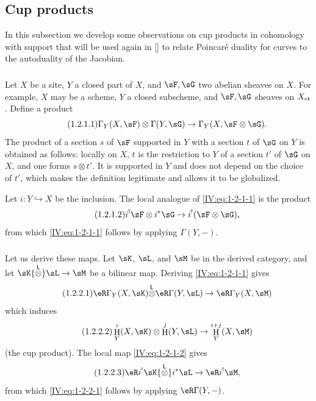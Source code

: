 \documentclass[12pt,oneside,english]{smfbook}
\DeclareMathOperator{\h}{H}
\newcommand{\et}[1]{{#1}_{\textnormal{et}}}
\newcommand{\lotimes}{{\overset{\mathsf{L}}{\otimes}}}
\begin{document}
\subsection{Cup products}\label{IV:1-2}

In this subsection we develop some observations on cup products in cohomology with support that will be used again in [] to relate Poincaré duality for curves to the autoduality of the Jacobian.

\subsubsection{}\label{IV:1-2-1}

Let $X$ be a site, $Y$ a closed part of $X$, and $\sF,\sG$ two abelian sheaves on $X$. For example, $X$ may be a scheme, $Y$ a closed subscheme, and $\sF,\sG$ sheaves on $\et X$. Define a product
\begin{equation*}\tag{1.2.1.1}\label{IV:eq:1-2-1-1}
  \Gamma_Y(X,\sF)\otimes \Gamma(Y,\sG) \to \Gamma_Y(X,\sF\otimes\sG) \text{.}
\end{equation*}
The product of a section $s$ of $\sF$ supported in $Y$ with a section $t$ of $\sG$ on $Y$ is obtained as follows: locally on $X$, $t$ is the restriction to $Y$ of a section $t'$ of $\sG$ on $X$, and one forms $s\otimes t'$. It is supported in $Y$ and does not depend on the choice of $t'$, which makes the definition legitimate and allows it to be globalized.

Let $i:Y\hookrightarrow X$ be the inclusion. The local analogue of \eqref{IV:eq:1-2-1-1} is the product
\begin{equation*}\tag{1.2.1.2}\label{IV:eq:1-2-1-2}
  i^!\sF\otimes i^*\sG \to i^!(\sF\otimes\sG) \text{,}
\end{equation*}
from which \eqref{IV:eq:1-2-1-1} follows by applying $\Gamma(Y,-)$.

\subsubsection{}\label{IV:1-2-2}

Let us derive these maps. Let $\sK$, $\sL$, and $\sM$ be in the derived category, and let $\sK\lotimes\sL\to\sM$ be a bilinear map. Deriving \eqref{IV:eq:1-2-1-1} gives
\begin{equation*}\tag{1.2.2.1}\label{IV:eq:1-2-2-1}
  \eR\Gamma_Y(X,\sK) \lotimes \eR\Gamma(Y,\sL) \to \eR\Gamma_Y(X,\sM)
\end{equation*}
which induces
\begin{equation*}\tag{1.2.2.2}\label{IV:eq:1-2-2-2}
  \h_Y^i(X,\sK)\otimes \h^j(Y,\sL) \to \h_Y^{i+j}(X,\sM)
\end{equation*}
(the cup product). The local map \eqref{IV:eq:1-2-1-2} gives
\begin{equation*}\tag{1.2.2.3}\label{IV:eq:1-2-2-3}
  \eR i^! \sK\lotimes i^*\sL \to \eR i^!\sM \text{,}
\end{equation*}
from which \eqref{IV:eq:1-2-2-1} follows by applying $\eR\Gamma(Y,-)$.
\end{document}
